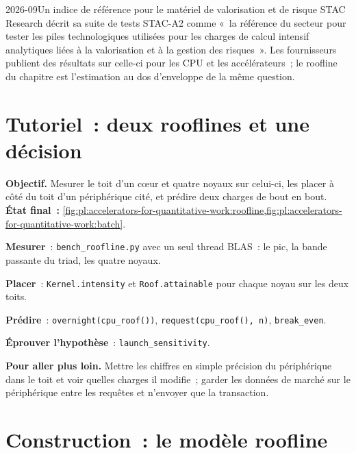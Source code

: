 \begin{dated}{2026-09}{Un indice de référence pour le matériel de valorisation et de risque}\label{dat:pl:accelerators-for-quantitative-work:stac}
STAC Research décrit sa suite de tests STAC-A2 comme «~la référence du secteur pour tester les piles technologiques utilisées pour les charges de calcul intensif
analytiques liées à la valorisation et à la gestion des risques~». Les fournisseurs publient des résultats sur celle-ci pour les CPU et les accélérateurs~; le
roofline du chapitre est l'estimation au dos d'enveloppe de la même question.
\end{dated}

\section{Tutoriel~: deux rooflines et une décision}\label{tut:pl:accelerators-for-quantitative-work:tut}

\begin{tutorial}
\textbf{Objectif.} Mesurer le toit d'un cœur et quatre noyaux sur celui-ci, les placer à côté du toit d'un périphérique cité, et prédire deux charges de
bout en bout. \textbf{État final~:} \cref{fig:pl:accelerators-for-quantitative-work:roofline,fig:pl:accelerators-for-quantitative-work:batch}.
\begin{tutsteps}
\item \textbf{Mesurer}~: \texttt{bench\_roofline.py} avec un seul thread BLAS~: le pic, la bande passante du triad, les quatre noyaux.
\item \textbf{Placer}~: \texttt{Kernel.intensity} et \texttt{Roof.attainable} pour chaque noyau sur les deux toits.
\item \textbf{Prédire}~: \texttt{overnight(cpu\_roof())}, \texttt{request(cpu\_roof(), n)}, \texttt{break\_even}.
\item \textbf{Éprouver l'hypothèse}~: \texttt{launch\_sensitivity}.
\end{tutsteps}
\textbf{Pour aller plus loin.} Mettre les chiffres en simple précision du périphérique dans le toit et voir quelles charges il modifie~; garder les données de marché
sur le périphérique entre les requêtes et n'envoyer que la transaction.
\end{tutorial}

\section{Construction~: le modèle roofline}\label{bld:pl:accelerators-for-quantitative-work:roofline}

